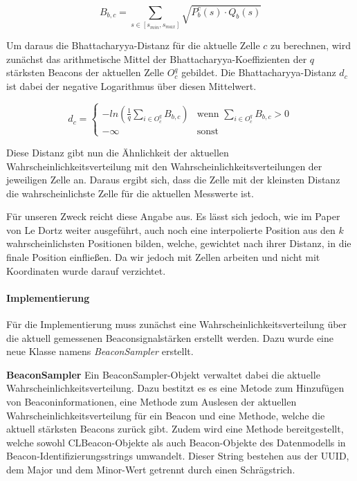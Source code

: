 \begin{equation}
	B_{b, c} = \sum_{s \in [s_{min},s_{max}]} \sqrt{P_{b}^{c}(s) \cdot Q_{b}(s)}
\end{equation}

Um daraus die Bhattacharyya-Distanz für die aktuelle Zelle $c$ zu berechnen, wird zunächst das arithmetische Mittel der Bhattacharyya-Koeffizienten der $q$ stärksten Beacons der aktuellen Zelle $O_{c}^{q}$ gebildet. Die Bhattacharyya-Distanz $d_{c}$ ist dabei der negative Logarithmus über diesen Mittelwert.

\begin{equation}
	d_{c}= \begin{cases}
	-ln (\frac{1}{q} \sum_{i \in O_{c}^{q}} B_{b, c}) & \text{wenn } \sum_{i \in O_{c}^{q}} B_{b, c} > 0 \\
	- \infty & \text{sonst}
	\end{cases}
\end{equation}

Diese Distanz gibt nun die Ähnlichkeit der aktuellen Wahrscheinlichkeitsverteilung mit den Wahrscheinlichkeitsverteilungen der jeweiligen Zelle an. Daraus ergibt sich, dass die Zelle mit der kleinsten Distanz die wahrscheinlichste Zelle für die aktuellen Messwerte ist.

Für unseren Zweck reicht diese Angabe aus. Es lässt sich jedoch, wie im Paper von Le Dortz \cite{wifiFingerprintProbability} weiter ausgeführt, auch noch eine interpolierte Position aus den $k$ wahrscheinlichsten Positionen bilden, welche, gewichtet nach ihrer Distanz, in die finale Position einfließen. Da wir jedoch mit Zellen arbeiten und nicht mit Koordinaten wurde darauf verzichtet. 

\paragraph{Implementierung}
\label{sec:implementation:fingerprinting:positioning:probability:implementiation}
Für die Implementierung muss zunächst eine Wahrscheinlichkeitsverteilung über die aktuell gemessenen Beaconsignalstärken erstellt werden. Dazu wurde eine neue Klasse namens \emph{BeaconSampler} erstellt. 


\textbf{BeaconSampler}
Ein BeaconSampler-Objekt verwaltet dabei die aktuelle Wahrscheinlichkeitsverteilung. Dazu bestitzt es es eine Metode zum Hinzufügen von Beaconinformationen, eine Methode zum Auslesen der aktuellen Wahrscheinlichkeitsverteilung für ein Beacon und eine Methode, welche die aktuell stärksten Beacons zurück gibt. Zudem wird eine Methode bereitgestellt, welche sowohl CLBeacon-Objekte als auch Beacon-Objekte des Datenmodells in Beacon-Identifizierungsstrings umwandelt. Dieser String bestehen aus der UUID, dem Major und dem Minor-Wert getrennt durch einen Schrägstrich.


